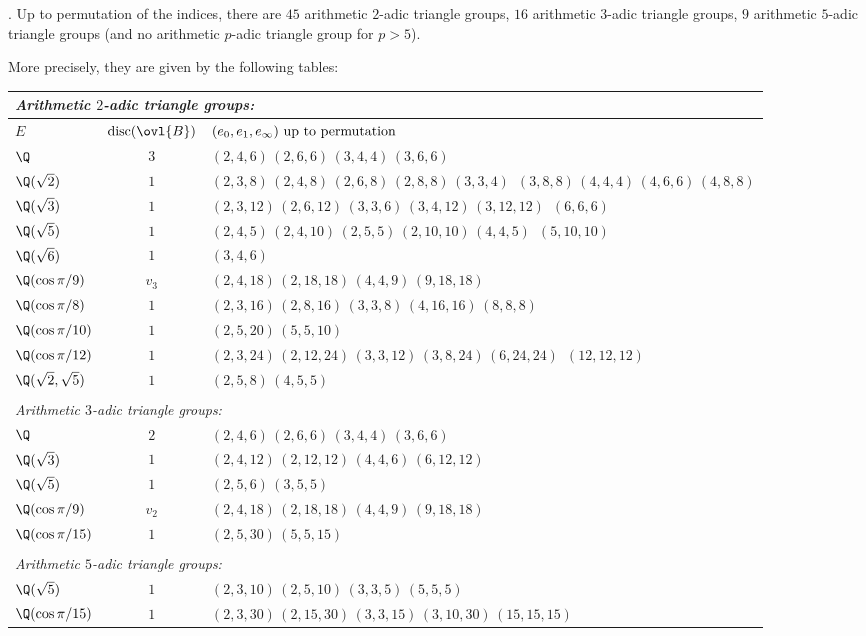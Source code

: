 \begin{thm}\label{thm::5.5.5} \cite{poaptg}. Up to permutation of the
 indices, there are $45$ arithmetic $2$-adic triangle groups, 
 $16$ arithmetic
 $3$-adic triangle groups, $9$ arithmetic $5$-adic triangle groups (and
 no arithmetic $p$-adic triangle group for $p>5$).

 More precisely, they are given by the following tables:

\begin{center}
 \renewcommand{\arraystretch}{1.5}
 \begin{longtable}{lcp{}}
 \multicolumn{3}{l}{\it Arithmetic $2$-adic triangle groups:}\\ \hline
 $E$ &$\mathrm{disc}(\ovl{B})$& $(e_0,e_1,e_\infty)
 \text{ \rm up to permutation}$ \\ \hline
 $\Q$ & $3$ & $(2,4,6)\,(2,6,6)\,(3,4,4)\,(3,6,6)$ \\
 $\Q(\sqrt 2)$ & $1$ &
 $(2,3,8)\, (2,4,8)\, (2,6,8)\, (2,8,8)\, (3,3,4)$\, $(3,8,8)\, 
 (4,4,4)\, (4,6,6)\, (4,8,8)$ \\
 $\Q(\sqrt 3)$ & $1$ &
 $(2,3,12)\, (2,6,12)\, (3,3,6)\, (3,4,12)\, (3,12,12)$\, $(6,6,6)$ \\
 $\Q(\sqrt 5)$ & $1$ &
 $(2,4,5)\, (2,4,10)\, (2,5,5)\, (2,10,10)\, (4,4,5)$\, $(5,10,10)$ \\
 $\Q(\sqrt 6)$ & $1$ & $(3,4,6)$ \\
 $\Q(\cos \pi/9)$ & $v_3$ & $(2,4,18)\, (2,18,18)\, (4,4,9)\, (9,18,18)$ \\
 $\Q(\cos \pi/8)$ & $1$ & $(2,3,16)\, (2,8,16)\, (3,3,8)\, (4,16,16)\,
 (8,8,8)$ \\ 
 $\Q(\cos \pi/10)$ & $1$ & $(2,5,20)\, (5,5,10)$  \\
 $\Q(\cos \pi/12)$ & $1$ &
 $(2,3,24)\, (2,12,24)\, (3,3,12)\, (3,8,24)\, (6,24,24)$\, $(12,12,12)$ \\
 $\Q(\sqrt 2, \sqrt 5)$ & $1$ & $(2,5,8)\, (4,5,5)$  \\ &&\\
 \multicolumn{3}{l}{\it Arithmetic $3$-adic triangle groups:} \\ \hline
 $\Q$ & $2$ & $(2,4,6)\, (2,6,6)\, (3,4,4)\, (3,6,6)$  \\
 $\Q(\sqrt 3)$ & $1$ & $(2,4,12)\, (2,12,12)\, (4,4,6)\, (6,12,12)$ \\
 $\Q(\sqrt 5)$ & $1$ & $(2,5,6)\, (3,5,5)$\\
 $\Q(\cos \pi/9)$ & $v_2$ & $(2,4,18)\, (2,18,18)\, (4,4,9)\, (9,18,18)$ \\
 $\Q(\cos \pi/15)$ & $1$ & $(2,5,30)\, (5,5,15)$ \\ && \\
 \multicolumn{3}{l}{\it Arithmetic $5$-adic triangle groups:}\\ \hline
 $\Q(\sqrt 5)$ & $1$ & $(2,3,10)\, (2,5,10)\, (3,3,5)\, (5,5,5)$ \\
 $\Q(\cos \pi/15)$ & $1$ &
 $(2,3,30)\, (2,15,30)\, (3,3,15)\, (3,10,30)\, (15,15,15)$ \\
 \end{longtable} 
\end{center}
\end{thm}

